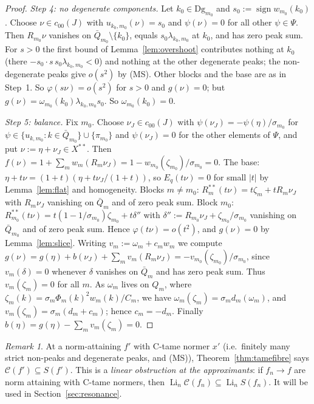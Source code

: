 \documentclass[10pt]{amsart}
\theoremstyle{definition}
\theoremstyle{remark}
\newtheorem{remark}[theorem]{Remark}
\newcommand{\sgn}{\operatorname{sign}}
\newcommand{\Cset}{\mathcal C}
\newcommand{\Li}{\operatorname*{Li}}
\begin{document}
\begin{proof}
\emph{Step 4: no degenerate components.}  Let $k_0\in \mathrm{Dg}_{m_0}$ and
$s_0:=\sgn w_{m_0}(k_0)$.  Choose $\nu\in c_{00}(J)$ with
$u_{k_0,m_0}(\nu)=s_0$ and $\psi(\nu)=0$ for all other $\psi\in\Psi$.  Then
$R_{m_0}\nu$ vanishes on $\bar Q_{m_0}\setminus\{k_0\}$, equals
$s_0\lambda_{k_0,m_0}$ at $k_0$, and has zero peak sum.  For $s>0$ the
first bound of Lemma~\ref{lem:overshoot} contributes nothing at $k_0$
(there $-s_0\cdot s\,s_0\lambda_{k_0,m_0}<0$) and nothing at the other
degenerate peaks; the non-degenerate peaks give $o(s^2)$ by (MS).  Other
blocks and the base are as in Step~1.  So $\varphi(s\nu)=o(s^2)$ for
$s>0$ and $g(\nu)=0$; but
$g(\nu)=\omega_{m_0}(k_0)\lambda_{k_0,m_0}s_0$.  So $\omega_{m_0}(k_0)=0$.

\emph{Step 5: balance.}  Fix $m_0$.  Choose $\nu_J\in c_{00}(J)$ with
$\psi(\nu_J)=-\psi(\eta)/\sigma_{m_0}$ for $\psi\in\{u_{k,m_0}:k\in\bar
Q_{m_0}\}\cup\{\pi_{m_0}\}$ and $\psi(\nu_J)=0$ for the other elements of
$\Psi$, and put $\nu:=\eta+\nu_J\in X^{**}$.  Then
$f(\nu)=1+\sum_mw_m(R_m\nu_J)=1-w_{m_0}(\zeta_{m_0})/\sigma_{m_0}=0$.  The
base: $\eta+t\nu=(1+t)(\eta+t\nu_J/(1+t))$, so $E_q(t\nu)=0$ for small
$|t|$ by Lemma~\ref{lem:flat} and homogeneity.  Blocks $m\ne m_0$:
$R_m^{**}(t\nu)=t\zeta_m+tR_m\nu_J$ with $R_m\nu_J$ vanishing on $\bar Q_m$
and of zero peak sum.  Block $m_0$: $R^{**}_{m_0}(t\nu)=t(1-1/\sigma_{m_0})
\zeta_{m_0}+t\delta''$ with $\delta'':=R_{m_0}\nu_J+\zeta_{m_0}/\sigma_{m_0}$
vanishing on $\bar Q_{m_0}$ and of zero peak sum.  Hence $\varphi(t\nu)=
o(t^2)$, and $g(\nu)=0$ by Lemma~\ref{lem:slice}.  Writing
$v_m:=\omega_m+c_mw_m$ we compute $g(\nu)=g(\eta)+b(\nu_J)+\sum_m
v_m(R_m\nu_J)=-v_{m_0}(\zeta_{m_0})/\sigma_{m_0}$, since $v_m(\delta)=0$
whenever $\delta$ vanishes on $\bar Q_m$ and has zero peak sum.  Thus
$v_m(\zeta_m)=0$ for all $m$.  As $\omega_m$ lives on $Q_m$, where
$\zeta_m(k)=\sigma_m\Phi_m(k)^2w_m(k)/C_m$, we have
$\omega_m(\zeta_m)=\sigma_md_m(\omega_m)$, and $v_m(\zeta_m)=\sigma_m(d_m+
c_m)$; hence $c_m=-d_m$.  Finally $b(\eta)=g(\eta)-\sum_mv_m(\zeta_m)=0$.
\end{proof}

\begin{remark}\label{rem:tameNA}
At a norm-attaining $f'$ with C-tame normer $x'$ (i.e.\ finitely many
strict non-peaks and degenerate peaks, and (MS)), Theorem~\ref{thm:tamefibre}
says $\Cset(f')\subseteq S(f')$.  This is a \emph{linear obstruction at the
approximants}: if $f_n\to f$ are norm attaining with C-tame normers, then
$\Li_n\Cset(f_n)\subseteq\Li_nS(f_n)$.  It will be used in
Section~\ref{sec:resonance}.
\end{remark}
\end{document}
